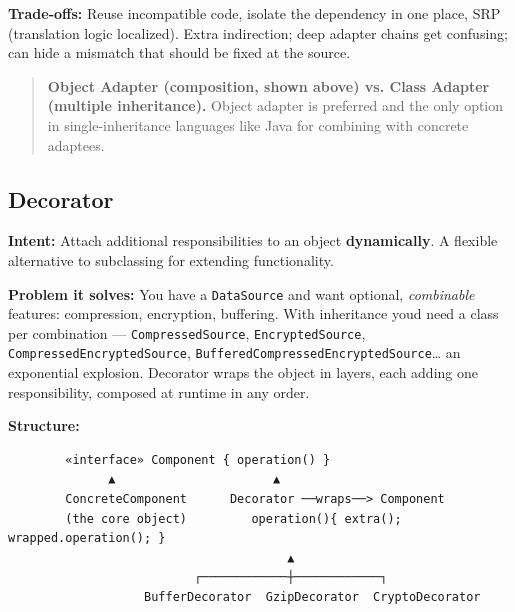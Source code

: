 \documentclass[11pt]{article}
\begin{document}
\textbf{Trade-offs:} Reuse incompatible code, isolate the dependency in one place, SRP (translation logic localized). Extra indirection; deep adapter chains get confusing; can hide a mismatch that should be fixed at the source.

\begin{quote}
\textbf{Object Adapter (composition, shown above) vs. Class Adapter (multiple inheritance).} Object adapter is preferred and the only option in single-inheritance languages like Java for combining with concrete adaptees.
\end{quote}

\subsection{Decorator}\label{decorator}

\textbf{Intent:} Attach additional responsibilities to an object \textbf{dynamically}. A flexible alternative to subclassing for extending functionality.

\textbf{Problem it solves:} You have a \texttt{DataSource} and want optional, \emph{combinable} features: compression, encryption, buffering. With inheritance you\textquotesingle d need a class per combination --- \texttt{CompressedSource}, \texttt{EncryptedSource}, \texttt{CompressedEncryptedSource}, \texttt{BufferedCompressedEncryptedSource}\ldots{} an exponential explosion. Decorator wraps the object in layers, each adding one responsibility, composed at runtime in any order.

\textbf{Structure:}

\setcodelang{}

\begin{verbatim}
        «interface» Component { operation() }
              ▲                      ▲
        ConcreteComponent      Decorator ──wraps──> Component
        (the core object)         operation(){ extra(); wrapped.operation(); }
                                       ▲
                          ┌────────────┼────────────┐
                   BufferDecorator  GzipDecorator  CryptoDecorator
\end{verbatim}

\end{document}

